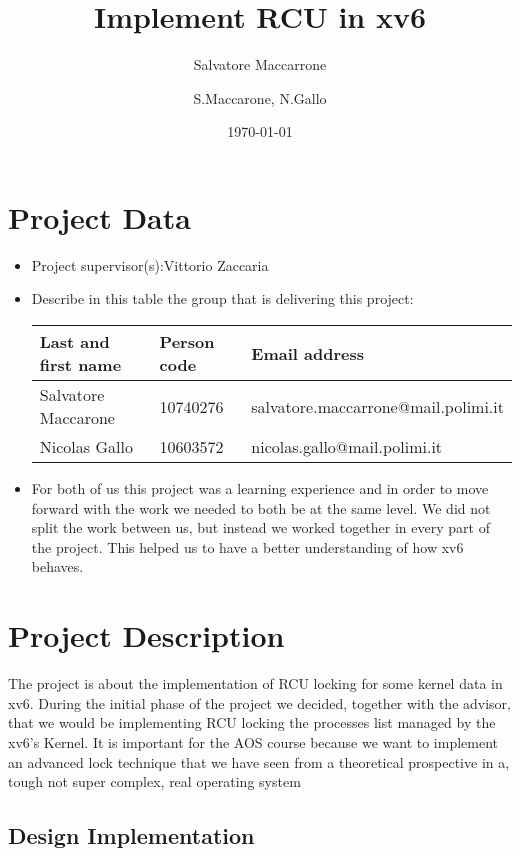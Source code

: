 \documentclass[10pt,a4]{article}
\author{Salvatore Maccarrone}
\author{S.Maccarone, N.Gallo}
\date{\today}
\title{Implement RCU in xv6}
\begin{document}
\maketitle
\tableofcontents


\section{Project Data}
\begin{itemize}
\item 
  Project supervisor(s):Vittorio Zaccaria
\item 
Describe in this table the group that is delivering this project:

\begin{center}
\begin{tabular}{lll}
Last and first name & Person code & Email address\\
\hline
  Salvatore Maccarone & 10740276 & salvatore.maccarrone@mail.polimi.it \\
  Nicolas Gallo & 10603572 & nicolas.gallo@mail.polimi.it                     
\end{tabular}
\end{center}
\item
For both of us this project was a learning experience and in order to move forward with the work we needed to both be at the same level. We did not split the work between us, but instead we worked together in every part of the project. This helped us to have a better understanding of how xv6 behaves.

\end{itemize}



\section{Project Description}

\begin{itemize}
The project is about the implementation of RCU locking for some kernel data in xv6. During the initial phase of the project we decided, together with the advisor, that we would be implementing RCU locking the processes list managed by the xv6's Kernel.
It is important for the AOS course because we want to implement an advanced lock technique that we have seen from a theoretical prospective in a, tough not super complex, real operating system
\end{itemize}

\subsection{Design Implementation}
\end{document}
